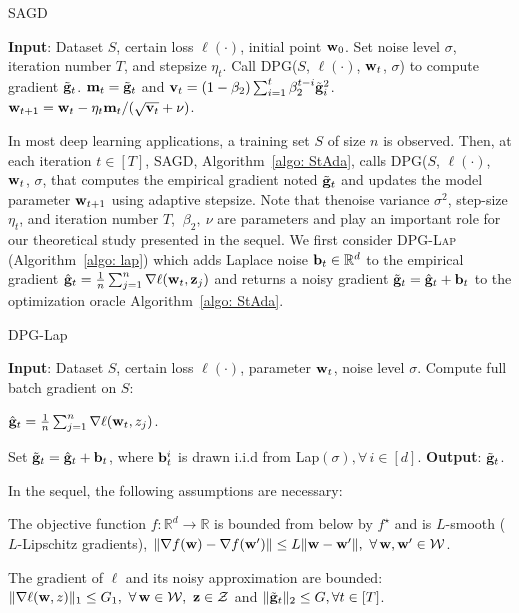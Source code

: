 \documentclass[11pt]{article}
\begin{document}
\begin{algorithm}[t] 
\caption{\textsc{SAGD}}
\begin{algorithmic}[1] \label{algo: StAda}
\STATE \textbf{Input}: Dataset $S$,  certain loss $\ell(\cdot)$, initial point $\mathbf{w}_0$.
\STATE Set  noise level $\sigma$, iteration number $T$,  and stepsize $\eta_t$.
\STATE \label{line:dpg} Call DPG($S$,  $\ell(\cdot)$, $\mathbf{w}_t$, $\sigma$) to compute gradient $\tilde {\mathbf{g}}_t$.
\STATE  \label{line:adap1}
$\mathbf{m}_t = \tilde {\mathbf{g}}_t$ and $\mathbf{v}_t = \left(1-\beta_{2}\right) \sum_{i=1}^{t} \beta_{2}^{t-i} \tilde {\mathbf{g}}_{i}^{2}$.
\STATE  \label{line:adap2} $\mathbf{w}_{t+1}=\mathbf{w}_{t}-\eta_t \mathbf{m}_t /(\sqrt{\mathbf{v}_t}+\nu)$.
\ENDFOR 
\end{algorithmic}
\end{algorithm}
In most deep learning applications, a training set $S$ of size $n$ is observed.
Then, at each iteration $t \in [T]$, \textsc{SAGD}, Algorithm~\ref{algo: StAda}, calls DPG($S$,  $\ell(\cdot)$, $\mathbf{w}_t$, $\sigma$, that computes the empirical gradient noted $\tilde {\mathbf{g}}_t$ and updates the model parameter $\mathbf{w}_{t+1}$ using adaptive stepsize.
Note that thenoise variance $\sigma^2$, step-size $\eta_t$, and iteration number $T$, $~ \beta_2,~\nu$ are parameters and play an important role for our theoretical study presented in the sequel. 
We first consider \textsc{DPG-Lap} (Algorithm~\ref{algo: lap}) which adds Laplace noise $\mathbf{b}_t \in \mathbb{R}^d$ to the empirical gradient $\hat {\mathbf{g}}_t = \frac{1}{n} \sum_{j=1}^n\nabla \ell(\mathbf{w}_t, \mathbf{z}_j)$ and returns a noisy gradient $\tilde {\mathbf{g}}_t = \hat {\mathbf{g}}_t + \mathbf{b}_t$ to the optimization oracle Algorithm~\ref{algo: StAda}.
\begin{algorithm}[H]
\caption{DPG-Lap}
\begin{algorithmic}[1]
\label{algo: lap}
	\STATE \textbf{Input}: Dataset $S$,  certain loss $\ell(\cdot)$, parameter $\mathbf{w}_t$, noise level $\sigma$.
	\STATE Compute full batch gradient on $S$: \\
	\centerline{ $\hat {\mathbf{g}}_t = \frac{1}{n} \sum_{j=1}^n\nabla \ell(\mathbf{w}_t, z_j)$.}	
	\STATE Set $\tilde {\mathbf{g}}_t = \hat {\mathbf{g}}_t + \mathbf{b}_t$, where $\mathbf{b}_t^i$ is drawn i.i.d from Lap$(\sigma), \forall\, i \in [d]$.
	\STATE \textbf{Output}: $\tilde {\mathbf{g}}_t$.
	\end{algorithmic}
\end{algorithm}\vspace{-0.1in}
In the sequel, the following assumptions are necessary:
\begin{assumption}
The objective function $ f: \mathbb{R}^d \rightarrow \mathbb{R}$ is bounded from below by $f^\star$ and is $L$-smooth ($L$-Lipschitz gradients), \ie$\nr \|\nabla f(\w) -\nabla f(\w^\prime) \|\leq L \|\w-\w^\prime \|, ~ \forall\, \w, \w^\prime \in \cW$.
\end{assumption}
\begin{assumption}
The gradient of $\ell$ and its noisy approximation are bounded: $\|\nabla \ell (\w, z) \|_1 \leq G_1, \ \forall\,\w \in \cW, \  \z \in \cZ$ and $\|\tilde {\mathbf{g}}_t\|_2 \leq G, \forall t \in [T]$.
\end{assumption}
\end{document}
